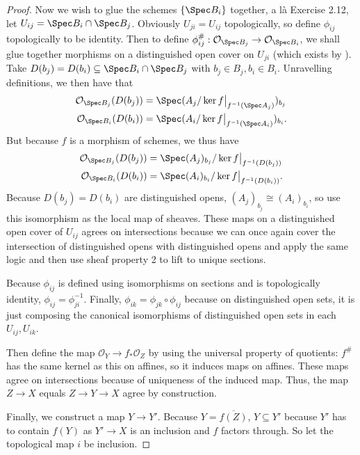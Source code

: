 \begin{proof}
	Now we wish to glue the schemes $\{\Spec B_i\}   $ together, a l\`a Exercise 2.12, let $U_{ij} = \Spec B_i \cap \Spec B_j $.
	Obviously $U_{ji} = U_{ij} $ topologically, so define $\phi _{ij} $ topologically to be identity.
	Then to define $\phi^\#_{ij}: \mathcal{O}_{\Spec B_j} \to \mathcal{O}_{\Spec B_i}$, we shall glue together morphisms on a distinguished open cover on $U_{ji} $ (which exists by ).
	Take $D(b_j) = D(b_i) \subseteq \Spec B_i\cap \Spec B_j$ with $b_j\in B_j, b_i\in B_i $.
	Unravelling definitions, we then have that
	\begin{align*}
		\mathcal{O}_{\Spec B_j}(D(b_j)) &= \Spec (A_j / \ker f\big|_{f^{-1}(\Spec A_j)})_{b_j}\\
		\mathcal{O}_{\Spec B_i}(D(b_i)) &= \Spec (A_i / \ker f\big|_{f^{-1}(\Spec A_i)})_{b_i}.
	\end{align*}
	But because $f $ is a morphism of schemes, we thus have
	\begin{align*}
		\mathcal{O}_{\Spec B_j}(D(b_j)) &= \Spec (A_j)_{b_j} / \ker f\big|_{f^{-1}(D(b_j))} \\
		\mathcal{O}_{\Spec B_i}(D(b_i)) &= \Spec (A_i)_{b_i} / \ker f\big|_{f^{-1}(D(b_i))}.
	\end{align*}
	Because $D(b_j)=D(b_i) $ are distinguished opens, $(A_j)_{b_j} \cong (A_i)_{b_i} $, so use this isomorphism as the local map of sheaves.
	These maps on a distinguished open cover of $U_{ij} $ agrees on intersections because we can once again cover the intersection of distinguished opens with distinguished opens and apply the same logic and then use sheaf property 2 to lift to unique sections.

	Because $\phi _{ij} $ is defined using isomorphisms on sections and is topologically identity, $\phi _{ij} = \phi _{ji}^{-1} $.
	Finally, $\phi _{ik} = \phi _{jk} \circ \phi _{ij} $ because on distinguished open sets, it is just composing the canonical isomorphisms of distinguished open sets in each $U_{ij},U_{ik} $.

	Then define the map $\mathcal{O}_Y\to f_\ast \mathcal{O}_Z $ by using the universal property of quotients: $f^\# $ has the same kernel as this on affines, so it induces maps on affines.
	These maps agree on intersections because of uniqueness of the induced map.
	Thus, the map $Z\to X $ equals $Z\to Y\to X $ agree by construction.

	Finally, we construct a map $Y\to Y' $.
	Because $Y = \overline{f(Z)}  $, $Y \subseteq Y'$ because $Y' $ has to contain $f(Y) $ as $Y' \to X $ is an inclusion and $f $ factors through.
	So let the topological map $i $ be inclusion.


\end{proof}
